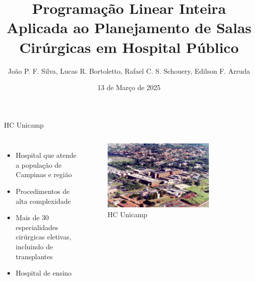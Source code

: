 \documentclass[handout]{beamer}
\title{Programação Linear Inteira Aplicada ao Planejamento de Salas Cirúrgicas em Hospital Público}
\subtitle{João P. F. Silva, Lucas R. Bortoletto, Rafael C. S. Schouery, Edilson F. Arruda}
\date{13 de Março de 2025}
\begin{document}
\maketitle

\begin{frame}{HC Unicamp}
    \begin{columns}
        \begin{itemize}
            \setlength\itemsep{1em}
            \item<2-> Hospital que atende a população de Campinas e região
            \item<3-> Procedimentos de alta complexidade
            \item<4-> Mais de 30 especialidades cirúrgicas eletivas, incluindo de transplantes
            \item<5-> Hospital de ensino
        \end{itemize}
        \begin{figure}
            \centering
            \includegraphics[width=0.8\textwidth]{images/aereahc.jpg}
            \caption{HC Unicamp}
        \end{figure}
    \end{columns}
\end{frame}
\end{document}
